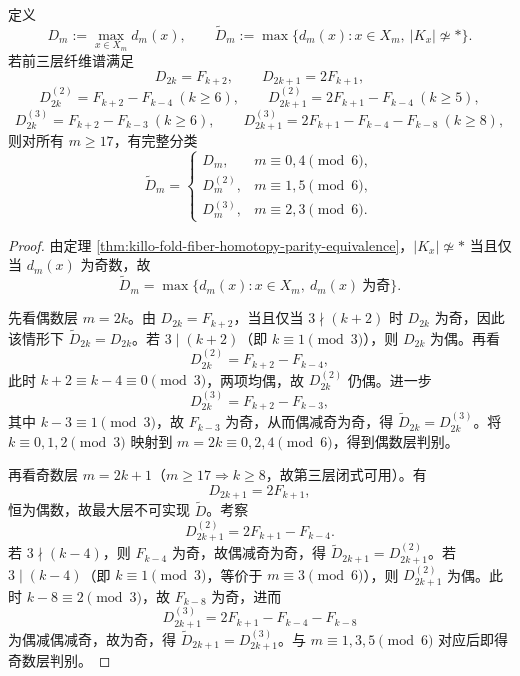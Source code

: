 \begin{theorem}\label{thm:killo-fold-max-noncontractible-fiber-mod6}
定义
\[
D_m:=\max_{x\in X_m} d_m(x),
\qquad
\widetilde D_m:=\max\{d_m(x):x\in X_m,\ |K_x|\not\simeq *\}.
\]
若前三层纤维谱满足
\[
D_{2k}=F_{k+2},\qquad D_{2k+1}=2F_{k+1},
\]
\[
D^{(2)}_{2k}=F_{k+2}-F_{k-4}\ (k\ge 6),\qquad
D^{(2)}_{2k+1}=2F_{k+1}-F_{k-4}\ (k\ge 5),
\]
\[
D^{(3)}_{2k}=F_{k+2}-F_{k-3}\ (k\ge 6),\qquad
D^{(3)}_{2k+1}=2F_{k+1}-F_{k-4}-F_{k-8}\ (k\ge 8),
\]
则对所有 \(m\ge 17\)，有完整分类
\[
\widetilde D_m=
\begin{cases}
D_m, & m\equiv 0,4 \pmod 6,\\[2mm]
D_m^{(2)}, & m\equiv 1,5 \pmod 6,\\[2mm]
D_m^{(3)}, & m\equiv 2,3 \pmod 6.
\end{cases}
\]
\end{theorem}
\begin{proof}
由定理 \ref{thm:killo-fold-fiber-homotopy-parity-equivalence}，\(|K_x|\not\simeq *\) 当且仅当 \(d_m(x)\) 为奇数，故
\[
\widetilde D_m=\max\{d_m(x):x\in X_m,\ d_m(x)\ \text{为奇}\}.
\]

先看偶数层 \(m=2k\)。由 \(D_{2k}=F_{k+2}\)，当且仅当 \(3\nmid(k+2)\) 时 \(D_{2k}\) 为奇，因此该情形下 \(\widetilde D_{2k}=D_{2k}\)。若 \(3\mid(k+2)\)（即 \(k\equiv 1\pmod 3\)），则 \(D_{2k}\) 为偶。再看
\[
D^{(2)}_{2k}=F_{k+2}-F_{k-4},
\]
此时 \(k+2\equiv k-4\equiv 0\pmod 3\)，两项均偶，故 \(D^{(2)}_{2k}\) 仍偶。进一步
\[
D^{(3)}_{2k}=F_{k+2}-F_{k-3},
\]
其中 \(k-3\equiv 1\pmod 3\)，故 \(F_{k-3}\) 为奇，从而偶减奇为奇，得 \(\widetilde D_{2k}=D^{(3)}_{2k}\)。将 \(k\equiv 0,1,2\pmod 3\) 映射到 \(m=2k\equiv 0,2,4\pmod 6\)，得到偶数层判别。

再看奇数层 \(m=2k+1\)（\(m\ge 17\Rightarrow k\ge 8\)，故第三层闭式可用）。有
\[
D_{2k+1}=2F_{k+1},
\]
恒为偶数，故最大层不可实现 \(\widetilde D\)。考察
\[
D^{(2)}_{2k+1}=2F_{k+1}-F_{k-4}.
\]
若 \(3\nmid(k-4)\)，则 \(F_{k-4}\) 为奇，故偶减奇为奇，得 \(\widetilde D_{2k+1}=D^{(2)}_{2k+1}\)。若 \(3\mid(k-4)\)（即 \(k\equiv 1\pmod 3\)，等价于 \(m\equiv 3\pmod 6\)），则 \(D^{(2)}_{2k+1}\) 为偶。此时 \(k-8\equiv 2\pmod 3\)，故 \(F_{k-8}\) 为奇，进而
\[
D^{(3)}_{2k+1}=2F_{k+1}-F_{k-4}-F_{k-8}
\]
为偶减偶减奇，故为奇，得 \(\widetilde D_{2k+1}=D^{(3)}_{2k+1}\)。与 \(m\equiv 1,3,5\pmod 6\) 对应后即得奇数层判别。
\end{proof}

